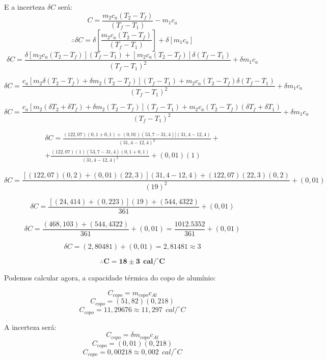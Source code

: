 E a incerteza  $\delta C$ será:
\[C =  \frac{ m_2 c_a (T_2 - T_f) }{(T_f - T_1)} - m_1 c_a \]
\[\therefore \delta C =  \delta \left[\frac{ m_2 c_a (T_2 - T_f) }{(T_f - T_1)}\right] +  \delta[m_1 c_a] \]
\[\delta C =  \frac{ \delta[m_2 c_a (T_2 - T_f)] (T_f - T_1)  + [m_2 c_a (T_2 - T_f)] \delta (T_f - T_1) }{(T_f - T_1)^2} + \delta m_1 c_a \]

\[\delta C =  \frac{c_a [ m_2  \delta(T_2 - T_f) + \delta m_2 (T_2 - T_f)] (T_f - T_1) + m_2 c_a (T_2 - T_f) \delta (T_f - T_1)  }{(T_f - T_1)^2} + \delta m_1 c_a \]

\[\delta C =  \frac{c_a [ m_2  (\delta T_2 + \delta T_f) + \delta m_2 (T_2 - T_f)] (T_f - T_1) + m_2 c_a (T_2 - T_f) (\delta T_f + \delta T_1)  }{(T_f - T_1)^2} + \delta m_1 c_a \]

\begin{multline*}
    \delta C = \frac{(122,07) (0,1 + 0,1) + (0,01) (53,7 - 31,4)] (31,4 - 12,4)}{(31,4 - 12,4)^2} +\\
    + \frac{(122,07) (1) (53,7 - 31,4) (0,1 + 0,1)}{(31,4 - 12,4)^2} + (0,01) (1)
\end{multline*}


\[\delta C =  \frac{[ (122,07)  (0,2) + (0,01) (22,3)] (31,4 - 12,4) + (122,07)(22,3)(0,2)  }{(19)^2} + (0,01)\]

\[\delta C =  \frac{[ (24,414) + (0,223)] (19) + (544,4322)  }{361} + (0,01)\]

\[\delta C =  \frac{(468,103) + (544,4322) }{361} + (0,01) = \frac{1012.5352}{361} + (0,01)\]

\[\delta C =  (2,80481) + (0,01) = 2,81481 \approx 3 \]

\[ \therefore \mathbf{C = 18 \pm 3 \ \ cal/^\circ C} \]


Podemos calcular agora, a capacidade térmica do copo de alumínio: 

\[C_{copo} = m_{copo} c_{Al}\]
\[C_{copo} = (51,82)(0,218) \]
\[C_{copo} = 11,29676 \approx 11,297 \ \ cal/^\circ C \]

A incerteza será:
\[C_{copo} = \delta m_{copo} c_{Al}\]
\[C_{copo} = (0,01)(0,218) \]
\[C_{copo} = 0,00218 \approx 0,002 \ \ cal/^\circ C \]

